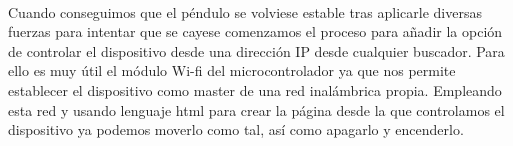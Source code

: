 \documentclass[]{article}
\begin{document}
  \paragraph{}
  
  Cuando conseguimos que el péndulo se volviese estable tras aplicarle diversas fuerzas para intentar que se cayese comenzamos el proceso para añadir la opción de controlar el dispositivo desde una dirección IP desde cualquier buscador. Para ello es muy útil el módulo Wi-fi del microcontrolador ya que nos permite establecer el dispositivo como master de una red inalámbrica propia. Empleando esta red y usando lenguaje html para crear la página desde la que controlamos el dispositivo ya podemos moverlo como tal, así como apagarlo y encenderlo.
  {\normalsize }
\end{document}
